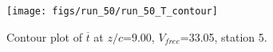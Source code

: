 \begin{figure}[H]
\centering
\texttt{[image: figs/run\_50/run\_50\_T\_contour]}
\caption{Contour plot of $\overline{t}$ at $z/c$=9.00, $V_{free}$=33.05, station 5.}
\end{figure}


